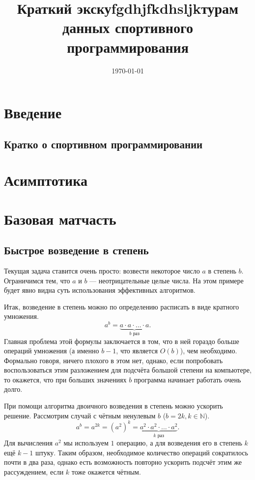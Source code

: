 \documentclass[a4paper,8pt]{article}
\begin{document}
\title{Краткий экскуfgdhjfkdhsljkтурам данных спортивного программирования}
\date{\today}
\maketitle
\newpage
\tableofcontents
\newpage

\section{Введение}
    \subsection{Кратко о спортивном программировании}
\section{Асимптотика} 
\section{Базовая матчасть}
    \subsection{Быстрое возведение в степень}
        Текущая задача ставится очень просто: возвести некоторое число \(a\) в степень \(b\). Ограничимся тем, что $a$ и $b$ --- неотрицательные целые числа. На этом примере будет явно видна суть использования эффективных алгоритмов.

        Итак, возведение в степень можно по определению расписать в виде кратного умножения.
        \[a^b=\underbrace{a \cdot a \cdot \ldots \cdot a}_\text{\(b\) раз}.\]
        Главная проблема этой формулы заключается в том, что в ней гораздо больше операций умножения (а именно $b - 1$, что является \(O(b)\)), чем необходимо. Формально говоря, ничего плохого в этом нет, однако, если попробовать воспользоваться этим разложением для подсчёта большой степени на компьютере, то окажется, что при больших значениях \(b\) программа начинает работать очень долго.

        При помощи алгоритма двоичного возведения в степень можно ускорить решение. Рассмотрим случай с чётным ненулевым $b$ (\(b = 2k, k \in \mathbb{N}\)).
        \[a^b = a^{2k} = (a^{2})^k = \underbrace{a^2 \cdot a^2 \cdot \ldots \cdot a^2}_\text{\(k\) раз}.\]
        Для вычисления $a^2$ мы используем $1$ операцию, а для возведения его в степень $k$ ещё $k - 1$ штуку. Таким образом, необходимое количество операций сократилось почти в два раза, однако есть возможность повторно ускорить подсчёт этим же рассуждением, если $k$ тоже окажется чётным.
\end{document}

